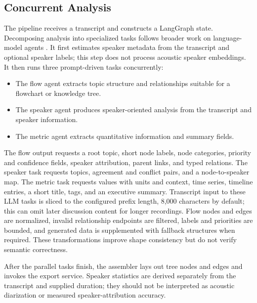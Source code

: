 \documentclass[conference]{IEEEtran}
\begin{document}
\subsection{Concurrent Analysis}
The pipeline receives a transcript and constructs a LangGraph state. Decomposing analysis into specialized tasks follows broader work on language-model agents \cite{agentsurvey}. It first estimates speaker metadata from the transcript and optional speaker labels; this step does not process acoustic speaker embeddings. It then runs three prompt-driven tasks concurrently:
\begin{itemize}
  \item The flow agent extracts topic structure and relationships suitable for a flowchart or knowledge tree.
  \item The speaker agent produces speaker-oriented analysis from the transcript and speaker information.
  \item The metric agent extracts quantitative information and summary fields.
\end{itemize}
The flow output requests a root topic, short node labels, node categories, priority and confidence fields, speaker attribution, parent links, and typed relations. The speaker task requests topics, agreement and conflict pairs, and a node-to-speaker map. The metric task requests values with units and context, time series, timeline entries, a short title, tags, and an executive summary. Transcript input to these LLM tasks is sliced to the configured prefix length, 8,000 characters by default; this can omit later discussion content for longer recordings. Flow nodes and edges are normalized, invalid relationship endpoints are filtered, labels and priorities are bounded, and generated data is supplemented with fallback structures when required. These transformations improve shape consistency but do not verify semantic correctness.

After the parallel tasks finish, the assembler lays out tree nodes and edges and invokes the export service. Speaker statistics are derived separately from the transcript and supplied duration; they should not be interpreted as acoustic diarization or measured speaker-attribution accuracy.
\end{document}
